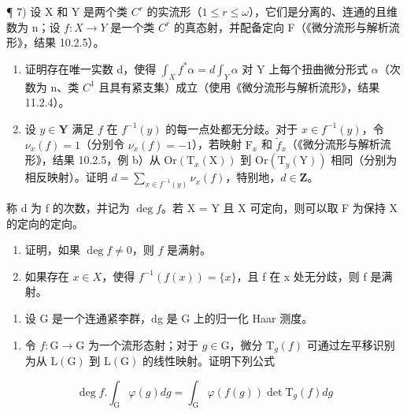 ¶ 7) 设 X 和 Y 是两个类 \(C^{r}\) 的实流形（\(1 \leq r \leq \omega\)），它们是分离的、连通的且维数为 n；设 \(f : X \to Y\) 是一个类 \(C^{r}\) 的真态射，并配备定向 F（《微分流形与解析流形》，结果 10.2.5）。

\begin{enumerate}
\def\labelenumi{\alph{enumi})}
\item
  证明存在唯一实数 d，使得 \(\int_{X} f^{*}\alpha = d\int_{Y}\alpha\) 对 Y 上每个扭曲微分形式 \(\alpha\)（次数为 n、类 \(C^{1}\) 且具有紧支集）成立（使用《微分流形与解析流形》，结果 11.2.4）。
\item
  设 \(y \in \mathbf{Y}\) 满足 \(f\) 在 \(f^{-1}(y)\) 的每一点处都无分歧。对于 \(x \in f^{-1}(y)\)，令 \(\nu_x(f) = 1\)（分别令 \(\nu_x(f) = -1\)），若映射 \(\mathrm{F}_x\) 和 \(\tilde{f}_x\)（《微分流形与解析流形》，结果 10.2.5，例 b）从 \(\mathrm{Or}(\mathrm{T}_x(\mathrm{X}))\) 到 \(\mathrm{Or}(\mathrm{T}_y(\mathrm{Y}))\) 相同（分别为相反映射）。证明 \(d = \sum_{x \in f^{-1}(y)} \nu_x(f)\)，特别地，\(d \in \mathbf{Z}\)。
\end{enumerate}

称 d 为 f 的次数，并记为 \(\deg f\)。若 X = Y 且 X 可定向，则可以取 F 为保持 X 的定向的定向。

\begin{enumerate}
\def\labelenumi{\alph{enumi})}
\setcounter{enumi}{2}
\item
  证明，如果 \(\deg f \neq 0\)，则 \(f\) 是满射。
\item
  如果存在 \(x \in X\)，使得 \(f^{-1}(f(x)) = \{x\}\)，且 f 在 x 处无分歧，则 f 是满射。
\end{enumerate}

\begin{enumerate}
\def\labelenumi{\arabic{enumi})}
\setcounter{enumi}{7}
\tightlist
\item
  设 G 是一个连通紧李群，dg 是 G 上的归一化 Haar 测度。
\end{enumerate}

\begin{enumerate}
\def\labelenumi{\alph{enumi})}
\tightlist
\item
  令 \(f: \mathrm{G} \to \mathrm{G}\) 为一个流形态射；对于 \(g \in \mathrm{G}\)，微分 \(\mathrm{T}_g(f)\) 可通过左平移识别为从 \(\mathrm{L}(\mathrm{G})\) 到 \(\mathrm{L}(\mathrm{G})\) 的线性映射。证明下列公式
\end{enumerate}

\[
\deg f. \int_ {\mathrm{G}} \varphi (g) d g = \int_ {\mathrm{G}} \varphi (f (g)) \det \mathrm{T} _ {g} (f) d g
\]

